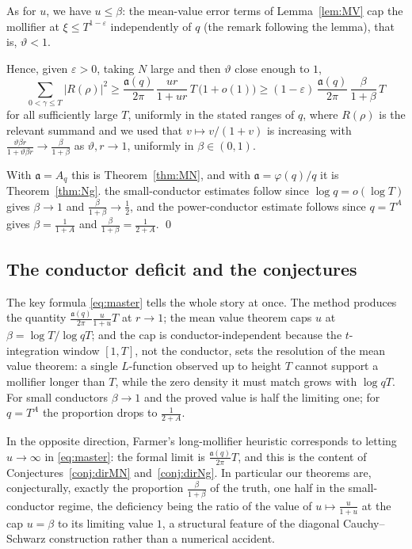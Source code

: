 \documentclass[10pt,a4paper]{amsart}
\numberwithin{equation}{section}
\begin{document}
As for $u$, we have $u\le\beta$: the mean-value error terms of Lemma~\ref{lem:MV} cap the mollifier at $\xi\le T^{1-\varepsilon}$ independently of $q$ (the remark following the lemma), that is, $\vartheta<1$.

Hence, given $\varepsilon>0$, taking $N$ large and then $\vartheta$ close enough to $1$,
\[
\sum_{0<\gamma\le T}|R(\rho)|^2\ge\frac{\mathfrak a(q)}{2\pi}\,\frac{ur}{1+ur}\,T\,\bigl(1+o(1)\bigr)\ge(1-\varepsilon)\,\frac{\mathfrak a(q)}{2\pi}\,\frac{\beta}{1+\beta}\,T
\]
for all sufficiently large $T$, uniformly in the stated ranges of $q$, where $R(\rho)$ is the relevant summand and we used that $v\mapsto v/(1+v)$ is increasing with $\tfrac{\vartheta\beta r}{1+\vartheta\beta r}\to\tfrac{\beta}{1+\beta}$ as $\vartheta,r\to1$, uniformly in $\beta\in(0,1)$.

With $\mathfrak a=A_q$ this is Theorem~\ref{thm:MN}, and with $\mathfrak a=\varphi(q)/q$ it is Theorem~\ref{thm:Ng}. the small-conductor estimates follow since $\log q=o(\log T)$ gives $\beta\to1$ and $\tfrac{\beta}{1+\beta}\to\tfrac12$, and the power-conductor estimate follows since $q=T^{A}$ gives $\beta=\tfrac1{1+A}$ and $\tfrac{\beta}{1+\beta}=\tfrac{1}{2+A}$. \qed

\subsection{The conductor deficit and the conjectures}\label{subsect:deficit}
The key formula \eqref{eq:master} tells the whole story at once. The method produces the quantity $\tfrac{\mathfrak a(q)}{2\pi}\tfrac{u}{1+u}T$ at $r\to1$; the mean value theorem caps $u$ at $\beta=\log T/\log qT$; and the cap is conductor-independent because the $t$-integration window $[1,T]$, not the conductor, sets the resolution of the mean value theorem: a single $L$-function observed up to height $T$ cannot support a mollifier longer than $T$, while the zero density it must match grows with $\log qT$. For small conductors $\beta\to1$ and the proved value is half the limiting one; for $q=T^A$ the proportion drops to $\tfrac1{2+A}$.

In the opposite direction, Farmer's long-mollifier heuristic \cite{Farmer} corresponds to letting $u\to\infty$ in \eqref{eq:master}: the formal limit is $\tfrac{\mathfrak a(q)}{2\pi}T$, and this is the content of Conjectures~\ref{conj:dirMN} and~\ref{conj:dirNg}. In particular our theorems are, conjecturally, exactly the proportion $\tfrac{\beta}{1+\beta}$ of the truth, one half in the small-conductor regime, the deficiency being the ratio of the value of $u\mapsto\tfrac{u}{1+u}$ at the cap $u=\beta$ to its limiting value $1$, a structural feature of the diagonal Cauchy--Schwarz construction rather than a numerical accident.
\end{document}

